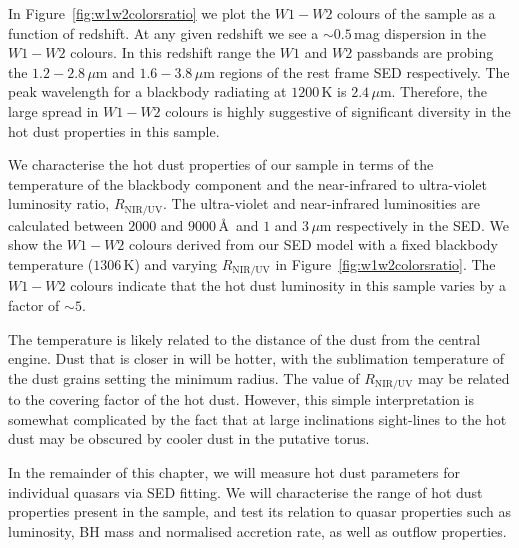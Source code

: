 In Figure~\ref{fig:w1w2colorsratio} we plot the $W1 - W2$ colours of the sample as a function of redshift.
At any given redshift we see a $\sim 0.5$\,mag dispersion in the $W1-W2$ colours.
In this redshift range the $W1$ and $W2$ passbands are probing the $1.2 - 2.8$\,$\mu$m and $1.6 - 3.8$\,$\mu$m regions of the rest frame SED respectively.
The peak wavelength for a blackbody radiating at $1200$\,K is $2.4$\,$\mu$m.
Therefore, the large spread in $W1-W2$ colours is highly suggestive of significant diversity in the hot dust properties in this sample.

We characterise the hot dust properties of our sample in terms of the temperature of the blackbody component and the near-infrared to ultra-violet luminosity ratio, $R_{\text{NIR/UV}}$.
The ultra-violet and near-infrared luminosities are calculated between $2000$ and $9000$\,\AA\, and $1$ and $3$\,$\mu$m respectively in the SED.
We show the $W1-W2$ colours derived from our SED model with a fixed blackbody temperature ($1306$\,K) and varying $R_{\text{NIR/UV}}$ in Figure~\ref{fig:w1w2colorsratio}.
The $W1-W2$ colours indicate that the hot dust luminosity in this sample varies by a factor of $\sim5$.

The temperature is likely related to the distance of the dust from the central engine.
Dust that is closer in will be hotter, with the sublimation temperature of the dust grains setting the minimum radius.
The value of $R_{\text{NIR/UV}}$ may be related to the covering factor of the hot dust.
However, this simple interpretation is somewhat complicated by the fact that at large inclinations sight-lines to the hot dust may be obscured by cooler dust in the putative torus.

In the remainder of this chapter, we will measure hot dust parameters for individual quasars via SED fitting.
We will characterise the range of hot dust properties present in the sample, and test its relation to quasar properties such as luminosity, BH mass and normalised accretion rate, as well as outflow properties.

